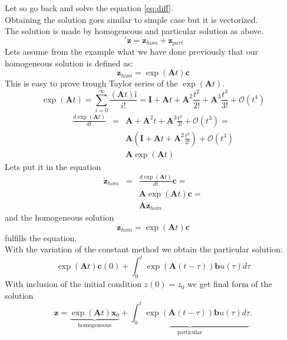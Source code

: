 Let so go back and solve the equation \ref{eq:diff}.\\
Obtaining the solution goes similar to simple case but it is vectorized.\\
The solution is made by homogeneous and particular solution as above.\\
\begin{equation}´
	\mathbf{z}=\mathbf{z}_{hom} + \mathbf{z}_{part}
\end{equation} 
Lets assume from the example what we have done previously that our homogeneous solution is defined as:
\begin{equation}
	\mathbf{z}_{hom}=\exp(\mathbf{A}t)\mathbf{c}
\end{equation}
This is easy to prove trough Taylor series of the $\exp(\mathbf{A}t)$.
\begin{equation}
	\exp(\mathbf{A}t) = \sum^{\infty}_{i=0}\frac{(\mathbf{A}t)î}{i!} = \mathbf{I}+ \mathbf{A}t+\mathbf{A}^2 \frac{t^2}{2!}+ \mathbf{A}^3 \frac{t^3}{3!} + \mathcal{O}(t^4)
\end{equation}
\begin{eqnarray}
	\frac{d\exp(\mathbf{A}t)}{dt} &=& \mathbf{A}+\mathbf{A}^2 t+ \mathbf{A}^3 \frac{t^2}{3!} + \mathcal{O}(t^3)=\\
	&&\mathbf{A}\left(\mathbf{I}+ \mathbf{A}t+\mathbf{A}^2 \frac{t^2}{2!}\right) + \mathcal{O}(t^3)\\
	&&\mathbf{A}\exp(\mathbf{A}t)
\end{eqnarray}
Lets put it in the equation
\begin{eqnarray}
	\dot{\mathbf{z}}_{hom}&=& \frac{d\exp(\mathbf{A}t)}{dt}\mathbf{c} =\\
	&&\mathbf{A}\exp(\mathbf{A}t)\mathbf{c} =\\
	&& \mathbf{A}\mathbf{z}_{hom}
\end{eqnarray}
and the homogeneous solution
\begin{equation}
	\boxed{
	\mathbf{z}_{hom} = \exp(\mathbf{A}t)\mathbf{c}}
\end{equation}
fulfills the equation.\\
With the variation of the constant method we obtain the particular solution:
\begin{equation}
\exp(\mathbf{A}t)\mathbf{c}(0)+ \int^t_0 \exp(\mathbf{A}(t-\tau))\mathbf{b}u(\tau)d\tau
\end{equation}
With inclusion of the initial condition $z(0) = z_0$ we get final form of the solution \\
\begin{equation}
	\boxed{\mathbf{z}= \underbrace{\exp(\mathbf{A}t)\mathbf{x}_0}_\text{homogeneous} + \underbrace{\int^t_0 \exp(\mathbf{A}(t-\tau))\mathbf{b}u(\tau)d\tau}_\text{particular}}.
\end{equation}\\

